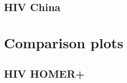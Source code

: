 \documentclass[a4paper,11pt]{article}
\begin{document}
\FloatBarrier
\subsection*{HIV China}


  
  
    


\section*{Comparison plots}

\subsection*{HIV HOMER+}
\end{document}
